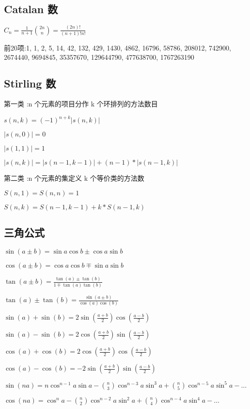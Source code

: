 \subsection{Catalan 数}
$C_n=\frac{1}{n+1}\binom{2n}{n}=\frac{(2n)!}{(n+1)!n!}$\par
前20项:1, 1, 2, 5, 14, 42, 132, 429, 1430, 4862, 16796, 58786, 208012, 742900, 2674440, 9694845, 35357670, 129644790, 477638700, 1767263190\par
\subsection{Stirling 数}
第一类 :n 个元素的项目分作 k 个环排列的方法数目\par
$s(n, k) = (-1)^{n+k}|s(n, k)|$\par
$|s(n, 0)| =0$\par
$|s(1, 1)| =1$\par
$|s(n, k)| =|s(n-1, k-1)|+(n-1)*|s(n-1, k)|$\par
第二类 :n 个元素的集定义 k 个等价类的方法数\par
$    S(n,1)=S(n,n)=1$\par
 $   S(n,k)=S(n-1,k-1)+k*S(n-1,k)$\par
\subsection{三角公式}
$\sin(a \pm b) = \sin a \cos b \pm \cos a \sin b$\par
$\cos(a \pm b) = \cos a \cos b \mp \sin a \sin b$\par
$\tan(a \pm b) = \frac{\tan(a)\pm\tan(b)}{1 \mp \tan(a)\tan(b)}$\par
$\tan(a) \pm \tan(b) = \frac{\sin(a \pm b)}{\cos(a)\cos(b)}$\par
$\sin(a) + \sin(b) = 2\sin(\frac{a + b}{2})\cos(\frac{a - b}{2})$\par
$\sin(a) - \sin(b) = 2\cos(\frac{a + b}{2})\sin(\frac{a - b}{2})$\par
$\cos(a) + \cos(b) = 2\cos(\frac{a + b}{2})\cos(\frac{a - b}{2})$\par
$\cos(a) - \cos(b) = -2\sin(\frac{a + b}{2})\sin(\frac{a - b}{2})$\par
$\sin(na) = n\cos^{n-1}a\sin a - \binom{n}{3}\cos^{n-3}a \sin^3a + \binom{n}{5}\cos^{n-5}a\sin^5a - \dots$\par
$\cos(na) = \cos^{n}a - \binom{n}{2}\cos^{n-2}a \sin^2a + \binom{n}{4}\cos^{n-4}a\sin^4a - \dots$\par
